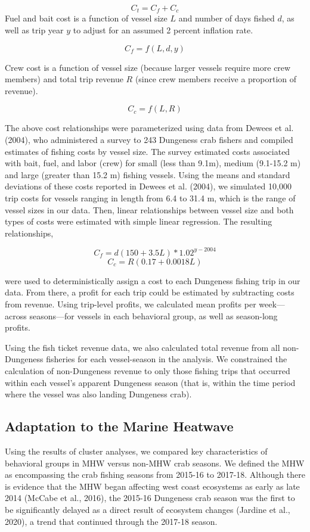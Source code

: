 \documentclass[]{elsarticle} %
\begin{document}
\[C_t = C_f + C_c\] Fuel and bait cost is a function of vessel size
\(L\) and number of days fished \(d\), as well as trip year \(y\) to
adjust for an assumed 2 percent inflation rate.

\[C_f = f(L,d,y)\]

Crew cost is a function of vessel size (because larger vessels require
more crew members) and total trip revenue \(R\) (since crew members
receive a proportion of revenue).

\[C_c = f(L,R)\]

The above cost relationships were parameterized using data from Dewees
et al. (2004), who administered a survey to 243 Dungeness crab fishers
and compiled estimates of fishing costs by vessel size. The survey
estimated costs associated with bait, fuel, and labor (crew) for small
(less than 9.1m), medium (9.1-15.2 m) and large (greater than 15.2 m)
fishing vessels. Using the means and standard deviations of these costs
reported in Dewees et al. (2004), we simulated 10,000 trip costs for
vessels ranging in length from 6.4 to 31.4 m, which is the range of
vessel sizes in our data. Then, linear relationships between vessel size
and both types of costs were estimated with simple linear regression.
The resulting relationships,

\[C_f = d(150+3.5L)*1.02^{y-2004}\] \[C_c = R(0.17 + 0.0018L)\]

were used to deterministically assign a cost to each Dungeness fishing
trip in our data. From there, a profit for each trip could be estimated
by subtracting costs from revenue. Using trip-level profits, we
calculated mean profits per week---across seasons---for vessels in each
behavioral group, as well as season-long profits.

Using the fish ticket revenue data, we also calculated total revenue
from all non-Dungeness fisheries for each vessel-season in the analysis.
We constrained the calculation of non-Dungeness revenue to only those
fishing trips that occurred within each vessel's apparent Dungeness
season (that is, within the time period where the vessel was also
landing Dungeness crab).

\hypertarget{adaptation-to-the-marine-heatwave}{%
\subsection{Adaptation to the Marine
Heatwave}\label{adaptation-to-the-marine-heatwave}}

Using the results of cluster analyses, we compared key characteristics
of behavioral groups in MHW versus non-MHW crab seasons. We defined the
MHW as encompassing the crab fishing seasons from 2015-16 to 2017-18.
Although there is evidence that the MHW began affecting west coast
ecosystems as early as late 2014 (McCabe et al., 2016), the 2015-16
Dungeness crab season was the first to be significantly delayed as a
direct result of ecosystem changes (Jardine et al., 2020), a trend that
continued through the 2017-18 season.
\end{document}
